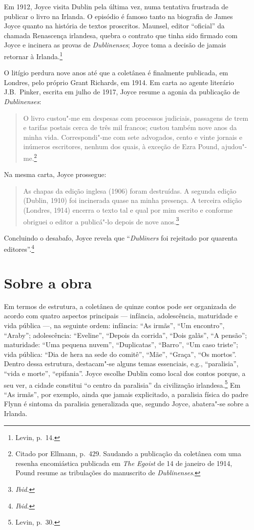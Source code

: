 {Em 1912, Joyce visita Dublin pela última vez, numa tentativa frustrada de
publicar o livro na Irlanda. O episódio é famoso tanto na biografia de James
Joyce quanto na história de textos proscritos. Maunsel, editor “oficial” da
chamada Renascença irlandesa, quebra o contrato que tinha sido firmado com
Joyce e incinera as provas de \textit{Dublinenses}; Joyce toma a decisão de
jamais retornar à Irlanda.\footnote{ Levin, p.~14.}

O litígio perdura nove anos até que a coletânea é finalmente publicada, em
Londres, pelo próprio Grant Richards, em 1914. Em carta ao agente literário J.B.~Pinker,
escrita em julho de 1917, Joyce resume a agonia da publicação de
\textit{Dublinenses}: 

\begin{quote}
O livro custou"-me em despesas com processos judiciais,
passagens de trem e tarifas postais cerca de três mil francos; custou também
nove anos da minha vida.  Correspondi"-me com sete advogados, cento e vinte
jornais e inúmeros escritores, nenhum dos quais, à exceção de Ezra Pound,
ajudou"-me.\footnote{  Citado por Ellmann, p.~429. Saudando a publicação da
coletânea com uma resenha encomiástica publicada em \textit{The
Egoist} de 14 de janeiro de 1914, Pound resume as tribulações do
manuscrito de \textit{Dublinenses}.} 
\end{quote}

Na mesma carta, Joyce prossegue: 

\begin{quote}
As chapas da edição inglesa (1906) foram destruídas. A segunda edição (Dublin, 1910) foi
incinerada quase na minha presença. A terceira edição (Londres, 1914) encerra o
texto tal e qual por mim escrito e conforme obriguei o editor a publicá"-lo
depois de nove anos.\footnote{ \textit{Ibid.}}
\end{quote}

Concluindo o desabafo, Joyce revela que
“\textit{Dubliners} foi rejeitado por quarenta editores”.\footnote{ \textit{Ibid.}}

\section{Sobre a obra}

Em termos de estrutura, a coletânea de quinze contos pode ser organizada de
acordo com quatro aspectos principais --- infância, adolescência, maturidade
e vida pública ---, na seguinte ordem: infância: “As irmãs”, “Um encontro”,
“Araby”; adolescência: “Eveline”, “Depois da corrida”, “Dois galãs”, “A
pensão”; maturidade: “Uma pequena nuvem”, “Duplicatas”, “Barro”, “Um caso
triste”; vida pública: “Dia de hera na sede do comitê”, “Mãe”, “Graça”, “Os
mortos”. Dentro dessa estrutura, destacam"-se alguns temas essenciais, e.g.,
“paralisia”, “vida e morte”, “epifania”.  Joyce escolhe Dublin como local dos
contos porque, a seu ver, a cidade constitui “o centro da paralisia” da
civilização irlandesa.\footnote{ Levin, p.~30.} Em “As irmãs”, por exemplo, ainda que
jamais explicitado, a paralisia física do padre Flynn é sintoma da paralisia
generalizada que, segundo Joyce, abatera"-se sobre a Irlanda.

}
